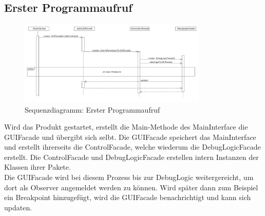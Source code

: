 \documentclass[parskip=full]{scrartcl}
\begin{document}
\subsection{Erster Programmaufruf}
\begin{figure}[!h]
\centering
\includegraphics[width=0.8\textwidth]{diagrammIdeenUmlet/SequenceDiagrams/seq_firstCallPDF.pdf}
\caption{Sequenzdiagramm: Erster Programmaufruf}
\end{figure}
Wird das Produkt gestartet, erstellt die Main-Methode des MainInterface die GUIFacade und übergibt sich selbt.
Die GUIFacade speichert das MainInterface und erstellt ihrerseits die ControlFacade, welche wiederum
die DebugLogicFacade erstellt.
Die ControlFacade und DebugLogicFacade erstellen intern Instanzen der Klassen ihrer Pakete. \\
Die GUIFacade wird bei diesem Prozess bis zur DebugLogic weitergereicht, um dort als Observer angemeldet werden
zu können. Wird später dann zum Beispiel ein Breakpoint hinzugefügt, wird die GUIFacade benachrichtigt und
kann sich updaten.

\newpage
\end{document}
